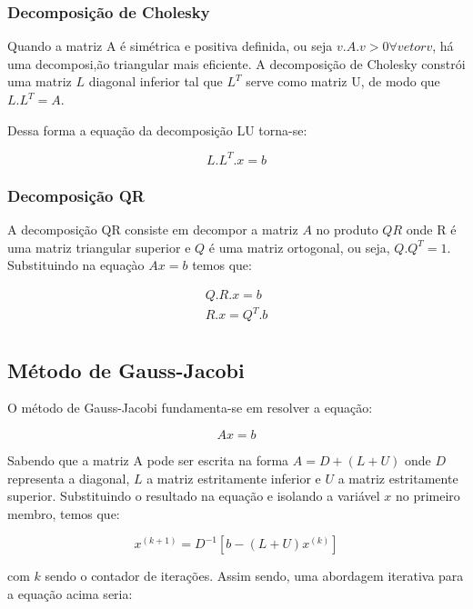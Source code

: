 \documentclass[a4paper,10pt]{report}
\begin{document}
\subsubsection{Decomposição de Cholesky}
Quando a matriz A é simétrica e positiva definida, ou seja $v.A.v > 0 \forall vetor v$, há uma decomposi,ão triangular mais eficiente. A decomposição de Cholesky constrói uma matriz $L$ diagonal inferior tal que $L^{T}$ serve como matriz U, de modo que $L.L^{T} = A$.

Dessa forma a equação da decomposição LU torna-se:

\begin{equation*}
L.L^{T}.x = b
\end{equation*}

\subsubsection{Decomposição QR}

A decomposição QR consiste em decompor a matriz $A$ no produto $QR$ onde R é
uma matriz triangular superior e $Q$ é uma matriz ortogonal, ou seja, $Q.Q^{T}
= 1$. Substituindo na equaçào $Ax = b$ temos que:

\begin{gather*}
Q.R.x = b\\
R.x = Q^{T}.b\\
\end{gather*}

\subsection{Método de Gauss-Jacobi}

O método de Gauss-Jacobi fundamenta-se em resolver a equação:

\begin{equation*}
Ax = b
\end{equation*}

Sabendo que a matriz A pode ser escrita na forma $ A = D + (L + U) $ onde $D$ representa a diagonal, $L$ a matriz estritamente inferior e $U$ a matriz estritamente superior. Substituindo o resultado na equação e isolando a variável $x$ no primeiro membro, temos que:

\begin{equation*}
x^{(k+1)}=D^{-1}[b-(L+U)x^{(k)}]
\end{equation*}

com $k$ sendo o contador de iterações. Assim sendo, uma abordagem iterativa para a equação acima seria:
\end{document}
